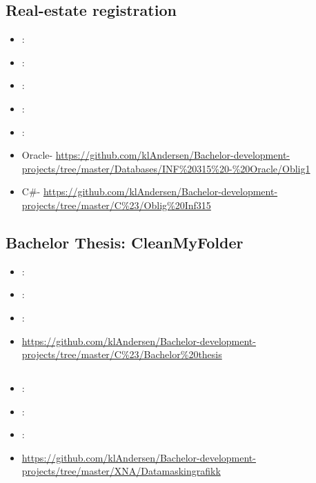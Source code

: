 \label{sec:section2}


\subsection{Real-estate registration}
\label{sec:real_estate}
\begin{itemize} 
	\item {}: 
	\item {}: 
	\item {}: 
	\item {}: 
	\item {}: 
	\item Oracle- \url{https://github.com/klAndersen/Bachelor-development-projects/tree/master/Databases/INF%20315%20-%20Oracle/Oblig1}
	\item C\#- \url{https://github.com/klAndersen/Bachelor-development-projects/tree/master/C%23/Oblig%20Inf315}
\end{itemize} 

\subsection{Bachelor Thesis: CleanMyFolder}
\label{sec:bach_thesis}
\begin{itemize} 
	\item {}: 
	\item {}: 
	\item {}: 
	\item {} \url{https://github.com/klAndersen/Bachelor-development-projects/tree/master/C%23/Bachelor%20thesis}
\end{itemize} 

\subsection[Computer Graphics]{}
\label{sec:comp_grahphics}
\begin{itemize} 
	\item {}: 
	\item {}: 
	\item {}: 
	\item {} \url{https://github.com/klAndersen/Bachelor-development-projects/tree/master/XNA/Datamaskingrafikk}
\end{itemize} 

